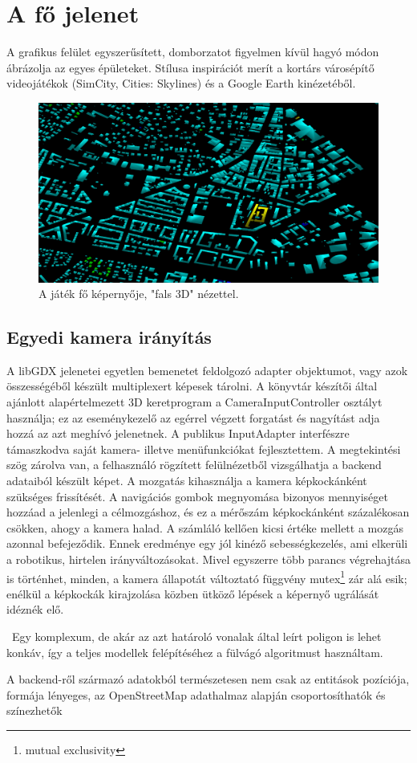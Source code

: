\section{A fő jelenet}
A grafikus felület egyszerűsített, domborzatot figyelmen kívül hagyó módon ábrázolja az egyes épületeket. Stílusa inspirációt merít a kortárs városépítő videojátékok (SimCity, Cities: Skylines) és a Google Earth kinézetéből. %
\begin{figure}[!ht]
    \centering
    \includegraphics[width=150mm, keepaspectratio]{images/main_graphics_view.png}
    \caption{A játék fő képernyője, "fals 3D" nézettel.}
\end{figure}

\subsection{Egyedi kamera irányítás}

A libGDX jelenetei egyetlen bemenetet feldolgozó adapter objektumot, vagy azok összességéből készült multiplexert képesek tárolni. A könyvtár készítői által ajánlott alapértelmezett 3D keretprogram\cite{basic3DlibGDX} a CameraInputController osztályt használja; ez az eseménykezelő az egérrel végzett forgatást és nagyítást adja hozzá az azt meghívó jelenetnek.
A publikus InputAdapter interfészre támaszkodva saját kamera- illetve menüfunkciókat fejlesztettem. A megtekintési szög zárolva van, a felhasználó rögzített felülnézetből vizsgálhatja a backend adataiból készült képet. A mozgatás kihasználja a kamera képkockánként szükséges frissítését. A navigációs gombok megnyomása bizonyos mennyiséget hozzáad a jelenlegi a célmozgáshoz, és ez a mérőszám képkockánként százalékosan csökken, ahogy a kamera halad. A számláló kellően kicsi értéke mellett a mozgás azonnal befejeződik.
Ennek eredménye egy jól kinéző sebességkezelés, ami elkerüli a robotikus, hirtelen irányváltozásokat. Mivel egyszerre több parancs végrehajtása is történhet, minden, a kamera állapotát változtató függvény mutex\footnote{mutual exclusivity} zár alá esik; enélkül a képkockák kirajzolása közben ütköző lépések a képernyő ugrálását idéznék elő.

\
 Egy komplexum, de akár az azt határoló vonalak által leírt poligon is lehet konkáv, így a teljes modellek felépítéséhez a fülvágó algoritmust használtam.

A backend-ről származó adatokból természetesen nem csak az entitások pozíciója, formája lényeges, az OpenStreetMap adathalmaz alapján csoportosíthatók és színezhetők  
